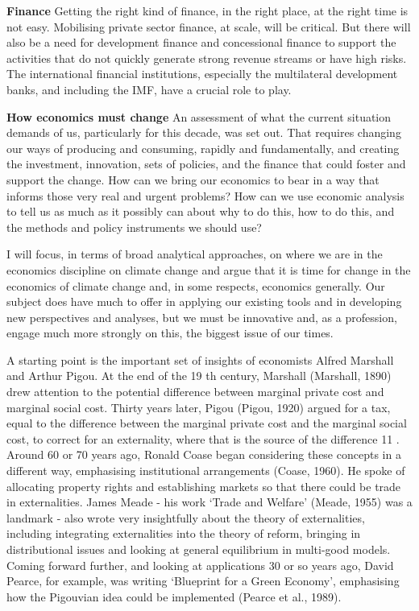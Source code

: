 \documentclass[
]{book}
\begin{document}
\textbf{Finance}
Getting the right kind of finance, in the right place, at the right time is not easy. Mobilising private
sector finance, at scale, will be critical. But there will also be a need for development finance and
concessional finance to support the activities that do not quickly generate strong revenue streams or
have high risks. The international financial institutions, especially the multilateral development banks,
and including the IMF, have a crucial role to play.

\textbf{How economics must change}
An assessment of what the current situation demands of us, particularly for this decade, was set out. That requires changing our ways of producing and consuming, rapidly and fundamentally, and
creating the investment, innovation, sets of policies, and the finance that could foster and support the
change. How can we bring our economics to bear in a way that informs those very real and urgent
problems? How can we use economic analysis to tell us as much as it possibly can about why to do
this, how to do this, and the methods and policy instruments we should use?

I will focus,
in terms of broad analytical approaches, on where we are in the economics discipline on climate change
and argue that it is time for change in the economics of climate change and, in some respects,
economics generally.
Our subject does have much to offer in
applying our existing tools and in developing new perspectives and analyses, but we must be innovative
and, as a profession, engage much more strongly on this, the biggest issue of our times.

A starting point is the important set of insights of economists Alfred Marshall and Arthur Pigou.
At the end of the 19 th century, Marshall (Marshall, 1890) drew attention to the potential difference
between marginal private cost and marginal social cost. Thirty years later, Pigou (Pigou, 1920) argued
for a tax, equal to the difference between the marginal private cost and the marginal social cost, to
correct for an externality, where that is the source of the difference 11 .
Around 60 or 70 years ago, Ronald Coase began considering these concepts in a different way,
emphasising institutional arrangements (Coase, 1960). He spoke of allocating property rights and
establishing markets so that there could be trade in externalities. James Meade - his work `Trade and
Welfare' (Meade, 1955) was a landmark - also wrote very insightfully about the theory of externalities,
including integrating externalities into the theory of reform, bringing in distributional issues and looking
at general equilibrium in multi-good models. Coming forward further, and looking at applications 30 or
so years ago, David Pearce, for example, was writing `Blueprint for a Green Economy', emphasising
how the Pigouvian idea could be implemented (Pearce et al., 1989).
\end{document}
